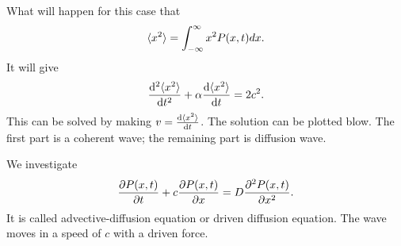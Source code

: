 What will happen for this case that
\begin{align}
\mathinner{\langle{x^2}\rangle} = \int_{-\infty}^{\infty} x^2 P(x,t) dx. 
\end{align}
It will give
\begin{align}
\frac{{\mathrm d}^2 {\mathinner{\langle{x^2}\rangle}}}{{\mathrm d}t^2} + \alpha \frac{{\mathrm d} {\mathinner{\langle{x^2}\rangle}}}{{\mathrm d}t} = 2c^2. 
\end{align}
This can be solved by making $ v=  \frac{{\mathrm d} {\mathinner{\langle{x^2}\rangle}}}{{\mathrm d}t}$. The solution can be plotted blow. 
The first part is a coherent wave; the remaining part is diffusion wave. 

We investigate
\begin{align}
\frac{\partial {P(x,t)}}{\partial t} + c \frac{\partial {P(x,t)}}{\partial {x}} = D\frac{\partial^2 {P(x,t)}}{\partial {x}^2}. 
\end{align}
It is called advective-diffusion equation or driven diffusion equation. The wave moves in a speed of $ c $ with a driven force. 
